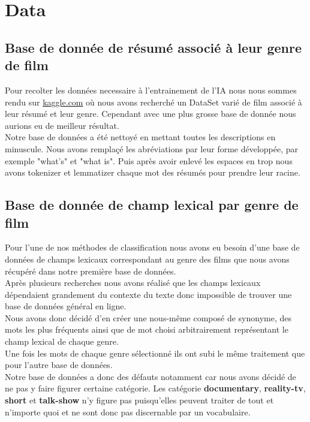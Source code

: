 \section{Data}

\subsection{Base de donnée de résumé associé à leur genre de film}

Pour recolter les données necessaire à l'entrainement de l'IA nous nous sommes rendu sur \href{https://www.kaggle.com/hijest/genre-classification-dataset-imdb/version/1}{kaggle.com} où nous avons recherché un DataSet varié de film associé à leur résumé et leur genre. Cependant avec une plus grosse base de donnée nous aurions eu de meilleur résultat.\\

Notre base de données a été nettoyé en mettant toutes les descriptions en minuscule. Nous avons remplaçé les abréviations par leur forme développée, par exemple "what's" et "what is".
Puis après avoir enlevé les espaces en trop nous avons tokenizer et lemmatizer chaque mot des résumés pour prendre leur racine.

\subsection{Base de donnée de champ lexical par genre de film}
Pour l’une de nos méthodes de classification nous avons eu besoin d’une base de données de champs lexicaux correspondant au genre des films que nous avons récupéré dans notre première base de données.\\
Après plusieurs recherches nous avons réalisé que les champs lexicaux dépendaient grandement du contexte du texte donc impossible de trouver une base de données général en ligne.\\
Nous avons donc décidé d’en créer une nous-même composé de synonyme, des mots les plus fréquents ainsi que de mot choisi arbitrairement représentant le champ lexical de chaque genre.\\
Une fois les mots de chaque genre sélectionné ils ont subi le même traitement que pour l’autre base de données.\\
Notre base de données a donc des défauts notamment car nous avons décidé de ne pas y faire figurer certaine catégorie. Les catégorie \textbf{documentary}, \textbf{reality-tv}, \textbf{short} et \textbf{talk-show} n'y figure pas puisqu’elles peuvent traiter de tout et n’importe quoi et ne sont donc pas discernable par un vocabulaire.